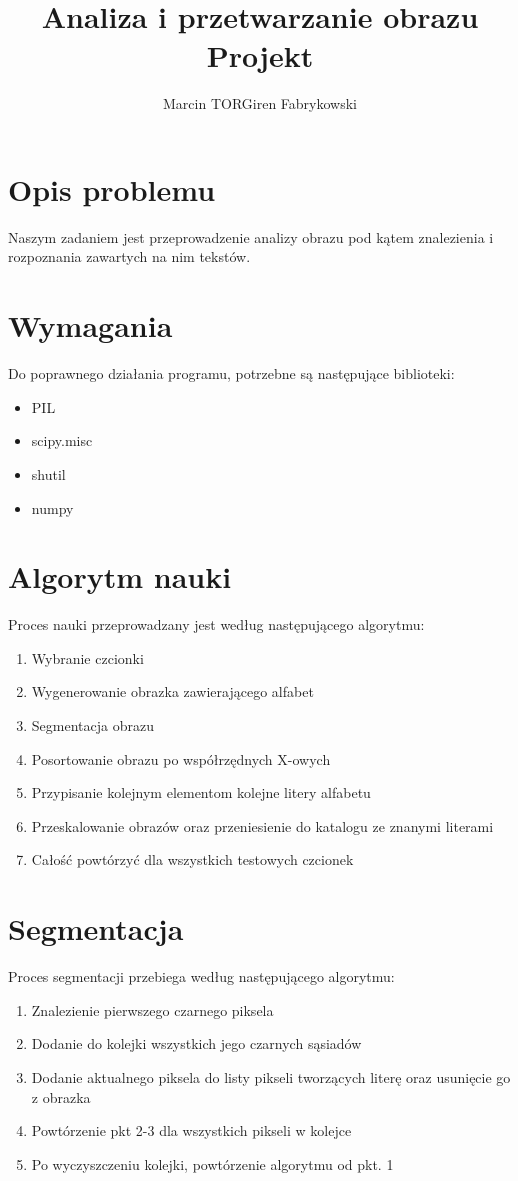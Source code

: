 \documentclass[a4paper, 12pt]{article}
\author{Marcin TORGiren Fabrykowski}
\title{Analiza i przetwarzanie obrazu\\Projekt}
\begin{document}
\maketitle
\newpage
\tableofcontents
\newpage
\section{Opis problemu}
Naszym zadaniem jest przeprowadzenie analizy obrazu pod kątem znalezienia i rozpoznania zawartych na nim tekstów.
\section{Wymagania}
Do poprawnego działania programu, potrzebne są następujące biblioteki:
\begin{itemize}
\item PIL
\item scipy.misc
\item shutil
\item numpy
\end{itemize}
\section{Algorytm nauki}
Proces nauki przeprowadzany jest według następującego algorytmu:
\begin{enumerate}
\item Wybranie czcionki
\item Wygenerowanie obrazka zawierającego alfabet
\item Segmentacja obrazu
\item Posortowanie obrazu po współrzędnych X-owych
\item Przypisanie kolejnym elementom kolejne litery alfabetu
\item Przeskalowanie obrazów oraz przeniesienie do katalogu ze znanymi literami
\item Całość powtórzyć dla wszystkich testowych czcionek
\end{enumerate}
\section{Segmentacja}
Proces segmentacji przebiega według następującego algorytmu:
\begin{enumerate}
\item Znalezienie pierwszego czarnego piksela
\item Dodanie do kolejki wszystkich jego czarnych sąsiadów
\item Dodanie aktualnego piksela do listy pikseli tworzących literę oraz usunięcie go z obrazka
\item Powtórzenie pkt 2-3 dla wszystkich pikseli w kolejce
\item Po wyczyszczeniu kolejki, powtórzenie algorytmu od pkt. 1
\end{enumerate}
\end{document}
